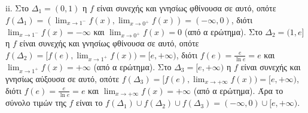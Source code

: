 \begin{alist}
\begin{rlist}
\item \label{item:beta:ii} ii. Στο $\Delta_1 = (0,1)$ η $f$ είναι συνεχής και γνησίως φθίνουσα σε αυτό, οπότε $f(\Delta_1) = (\lim_{x \to 1^-} f(x), \lim_{x \to 0^+} f(x)) = (-\infty, 0)$, διότι
$\lim_{x \to 1^-} f(x) = -\infty$ και $\lim_{x \to 0^+} f(x) = 0$ (από α ερώτημα).
Στο $\Delta_2 = (1, e]$ η $f$ είναι συνεχής και γνησίως φθίνουσα σε αυτό, οπότε $f(\Delta_2) = [f(e), \lim_{x \to 1^+} f(x)) = [e, +\infty)$, διότι
$f(e) = \frac{e}{\ln e} = e$ και $\lim_{x \to 1^+} f(x) = +\infty$ (από α ερώτημα).
Στο $\Delta_3 = [e, +\infty)$ η $f$ είναι συνεχής και γνησίως αύξουσα σε αυτό, οπότε $f(\Delta_3) = [f(e), \lim_{x \to +\infty} f(x)) = [e, +\infty)$, διότι
$f(e) = \frac{e}{\ln e} = e$ και $\lim_{x \to +\infty} f(x) = +\infty$ (από α ερώτημα).
Άρα το σύνολο τιμών της $f$ είναι το $f(\Delta_1) \cup f(\Delta_2) \cup f(\Delta_3) = (-\infty, 0) \cup [e, +\infty)$.
\end{rlist}


\end{alist}
